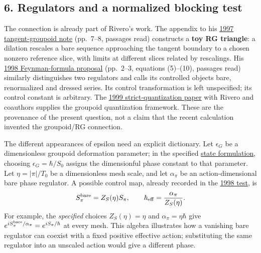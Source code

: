 \documentclass[11pt,a4paper]{article}
\begin{document}
\subsection{6. Regulators and a normalized blocking
test}\label{regulators-and-a-normalized-blocking-test}

The connection is already part of Rivero's work. The appendix to his
\href{https://arxiv.org/pdf/dg-ga/9710026}{1997 tangent-groupoid note}
(pp.~7--8, passages read) constructs a \textbf{toy RG triangle}: a
dilation rescales a bare sequence approaching the tangent boundary to a
chosen nonzero reference slice, with limits at different slices related
by rescalings. His \href{https://arxiv.org/pdf/quant-ph/9803035}{1998
Feynman-formula proposal} (pp.~2--3, equations (5)--(10), passages read)
similarly distinguishes two regulators and calls its controlled objects
bare, renormalized and dressed series. Its control transformation is
left unspecified; its control constant is arbitrary. The
\href{../docs/CarinenaEtAl_TangentGroupoid_1999.md}{1999
strict-quantization paper} with Rivero and coauthors supplies the
groupoid quantization framework. These are the provenance of the present
question, not a claim that the recent calculation invented the
groupoid/RG connection.

The different appearances of epsilon need an explicit dictionary. Let
\(\epsilon_G\) be a dimensionless groupoid deformation parameter; in the
specified \href{groupoid-quantum-newton-states.md}{state formulation},
choosing \(\epsilon_G=\hbar/S_0\) assigns the dimensionful phase
constant to that parameter. Let \(\eta=|\pi|/T_0\) be a dimensionless
mesh scale, and let \(\alpha_\pi\) be an action-dimensional bare phase
regulator. A possible control map, already recorded in the
\href{rivero-1998-conjecture-central-forces.md}{1998 test}, is \[
 S_\pi^{\rm bare}=Z_S(\eta)S_\pi,\qquad
 \hbar_{\rm eff}=\frac{\alpha_\pi}{Z_S(\eta)}.
\] For example, the \emph{specified} choices \(Z_S(\eta)=\eta\) and
\(\alpha_\pi=\eta\hbar\) give
\(e^{iS_\pi^{\rm bare}/\alpha_\pi}=e^{iS_\pi/\hbar}\) at every mesh.
This algebra illustrates how a vanishing bare regulator can coexist with
a fixed positive effective action; substituting the same regulator into
an unscaled action would give a different phase.
\end{document}
